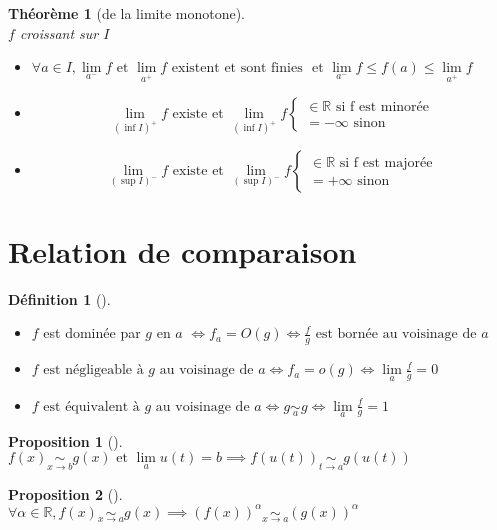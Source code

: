 \documentclass{article}
\newcommand{\R}{\mathbb{R}}
\newcommand{\et}{\text{ et }}
\newcommand{\lm}{\lim\limits}
\newcommand{\voi}[1]{\text{ au voisinage de }#1}
\newcommand{\equ}[1][]{\underset{#1}{\sim}}
\theoremstyle{definition}
\newtheorem*{prop}{Proposition}
\newtheorem*{defin}{Définition}
\theoremstyle{remark}
\theoremstyle{plain}
\newtheorem*{them}{Théorème}
\newenvironment{prp}[1][]
{\begin{prop}[#1]\quad\\}
{\end{prop}}
\newenvironment{dfn}[1][]
{\begin{defin}[#1]\quad\\}
{\end{defin}}
\newenvironment{thm}[1][]
{\begin{them}[#1]\quad\\}
{\end{them}}
\begin{document}
\begin{thm}[de la limite monotone]
$f$ croissant sur $I$
\begin{itemize}
    \item $\forall a \in I, \lm_{a^-} f \et \lm_{a^+} f 
    \text{ existent et sont finies }
    \et \lm_{a^-} f \leq f(a) \leq \lm_{a^+} f$
    \item \[
        \lm_{(\inf I)^+} f \text{ existe} \et
        \lm_{(\inf I)^+} f 
        \begin{cases}
            \in \R \text{ si f est minorée} \\
            = -\infty \text{ sinon}
        \end{cases}
    \]
    \item \[
        \lm_{(\sup I)^-} f \text{ existe} \et
        \lm_{(\sup I)^-} f 
        \begin{cases}
            \in \R \text{ si f est majorée} \\
            = +\infty \text{ sinon}
        \end{cases}
    \]
\end{itemize}
\end{thm}

\section{Relation de comparaison}

\begin{dfn}
\begin{itemize}
    \item $f$ est dominée par $g$ en $a$ $\iff f_a = O(g) \iff
    \frac{f}{g} \text{ est bornée} \voi{a}$
    \item $f \text{ est négligeable à } g \voi{a} \iff f_a = o(g)
    \iff \lm_a \frac{f}{g} = 0$
    \item $f \text{ est équivalent à } g \voi{a} \iff g \equ[a] g
    \iff \lm_a \frac{f}{g} = 1$
\end{itemize}
\end{dfn}

\begin{prp}
$f(x) \equ[x \to b] g(x) \et \lm_a u(t) = b 
\implies f(u(t)) \equ[t \to a] g(u(t))$
\end{prp}

\begin{prp}
$\forall \alpha \in \R, f(x) \equ[x \to a] g(x)
\implies (f(x))^\alpha \equ[x \to a] (g(x))^\alpha$
\end{prp}
\end{document}
